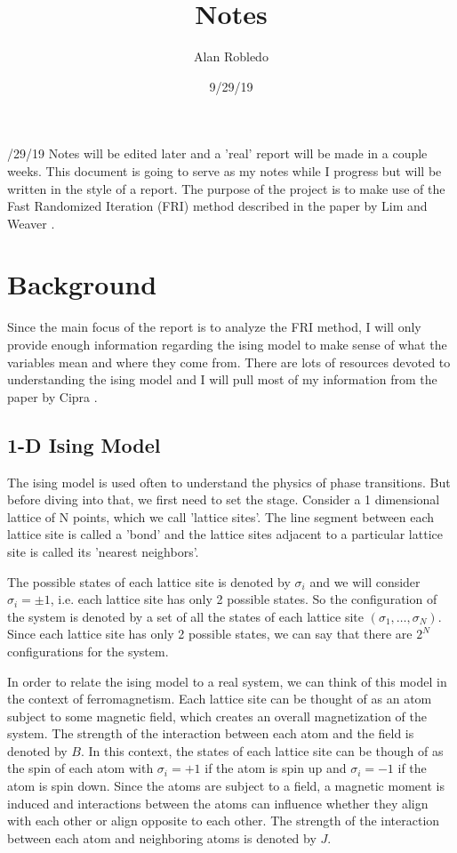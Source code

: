 \documentclass{article}
\title{Notes}
\date{9/29/19}
\author{Alan Robledo}
\begin{document}
/29/19 Notes will be edited later and a 'real' report will be made in a couple weeks.
This document is going to serve as my notes while I progress but will be written in the style of a report.
The purpose of the project is to make use of the Fast Randomized Iteration (FRI) method described in the paper by Lim and Weaver \cite{lim_weare}.
\section{Background}
Since the main focus of the report is to analyze the FRI method, I will only provide enough information regarding the ising model to make sense of what the variables mean and where they come from. There are lots of resources devoted to understanding the ising model and I will pull most of my information from the paper by Cipra \cite{cipra}.

\subsection{1-D Ising Model}
The ising model is used often to understand the physics of phase transitions.
But before diving into that, we first need to set the stage.
Consider a 1 dimensional lattice of N points, which we call 'lattice sites'.
The line segment between each lattice site is called a 'bond' and the lattice sites adjacent to a particular lattice site is called its 'nearest neighbors'.

The possible states of each lattice site is denoted by $\sigma_i$ and we will consider $\sigma_i = \pm 1$, i.e. each lattice site has only 2 possible states.
So the configuration of the system is denoted by a set of all the states of each lattice site $(\sigma_1, \dots, \sigma_N)$.
Since each lattice site has only 2 possible states, we can say that there are $2^N$ configurations for the system.

In order to relate the ising model to a real system, we can think of this model in the context of ferromagnetism.
Each lattice site can be thought of as an atom subject to some magnetic field, which creates an overall magnetization of the system.
The strength of the interaction between each atom and the field is denoted by $B$.
In this context, the states of each lattice site can be though of as the spin of each atom with $\sigma_i = +1$ if the atom is spin up and $\sigma_i = -1$ if the atom is spin down.
Since the atoms are subject to a field, a magnetic moment is induced and interactions between the atoms can influence whether they align with each other or align opposite to each other.
The strength of the interaction between each atom and neighboring atoms is denoted by $J$.
\end{document}
